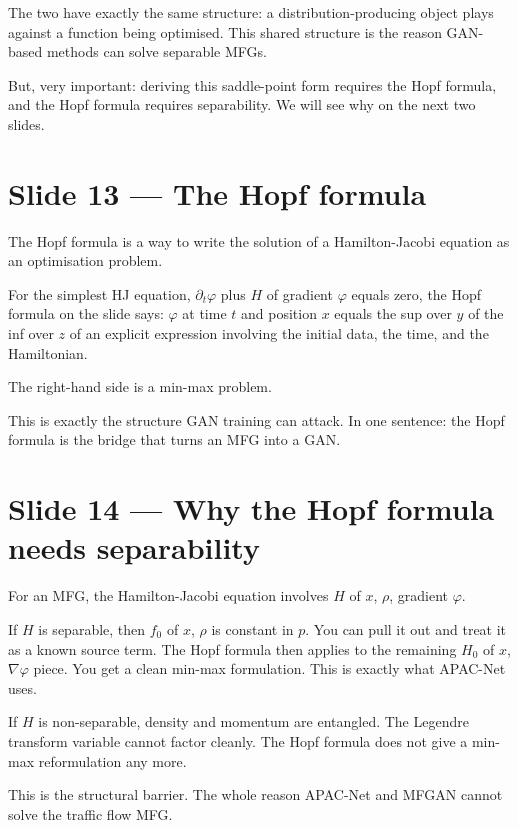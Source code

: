 \documentclass[11pt]{article}
\begin{document}
The two have exactly the same structure: a distribution-producing object
plays against a function being optimised.  This shared structure is the
reason GAN-based methods can solve separable MFGs.

But, very important: deriving this saddle-point form requires the Hopf
formula, and the Hopf formula requires separability.  We will see why on
the next two slides.

\section*{Slide 13 --- The Hopf formula}

The Hopf formula is a way to write the solution of a Hamilton-Jacobi
equation as an optimisation problem.

For the simplest HJ equation, $\partial_t \varphi$ plus $H$ of gradient
$\varphi$ equals zero, the Hopf formula on the slide says: $\varphi$ at
time $t$ and position $x$ equals the sup over $y$ of the inf over $z$ of
an explicit expression involving the initial data, the time, and the
Hamiltonian.

The right-hand side is a min-max problem.

This is exactly the structure GAN training can attack.  In one sentence:
the Hopf formula is the bridge that turns an MFG into a GAN.

\section*{Slide 14 --- Why the Hopf formula needs separability}

For an MFG, the Hamilton-Jacobi equation involves $H$ of $x$, $\rho$,
gradient $\varphi$.

If $H$ is separable, then $f_0$ of $x$, $\rho$ is constant in $p$.  You
can pull it out and treat it as a known source term.  The Hopf formula
then applies to the remaining $H_0$ of $x$, $\nabla\varphi$ piece.  You
get a clean min-max formulation.  This is exactly what APAC-Net uses.

If $H$ is non-separable, density and momentum are entangled.  The
Legendre transform variable cannot factor cleanly.  The Hopf formula
does not give a min-max reformulation any more.

This is the structural barrier.  The whole reason APAC-Net and MFGAN
cannot solve the traffic flow MFG.
\end{document}
